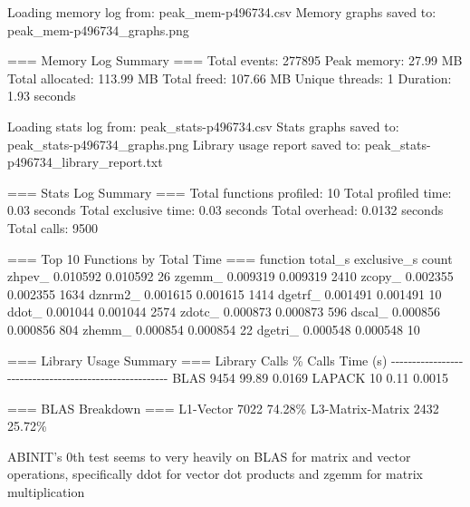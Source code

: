 \documentclass[
]{article}
\newenvironment{Shaded}{}{}
\newcommand{\NormalTok}[1]{#1}
\begin{document}
\begin{Shaded}
\begin{Highlighting}[]
\NormalTok{Loading memory log from: peak\_mem{-}p496734.csv}
\NormalTok{Memory graphs saved to: peak\_mem{-}p496734\_graphs.png}

\NormalTok{=== Memory Log Summary ===}
\NormalTok{Total events: 277895}
\NormalTok{Peak memory: 27.99 MB}
\NormalTok{Total allocated: 113.99 MB}
\NormalTok{Total freed: 107.66 MB}
\NormalTok{Unique threads: 1}
\NormalTok{Duration: 1.93 seconds}

\NormalTok{Loading stats log from: peak\_stats{-}p496734.csv}
\NormalTok{Stats graphs saved to: peak\_stats{-}p496734\_graphs.png}
\NormalTok{Library usage report saved to: peak\_stats{-}p496734\_library\_report.txt}

\NormalTok{=== Stats Log Summary ===}
\NormalTok{Total functions profiled: 10}
\NormalTok{Total profiled time: 0.03 seconds}
\NormalTok{Total exclusive time: 0.03 seconds}
\NormalTok{Total overhead: 0.0132 seconds}
\NormalTok{Total calls: 9500}

\NormalTok{=== Top 10 Functions by Total Time ===}
\NormalTok{function  total\_s  exclusive\_s  count}
\NormalTok{  zhpev\_ 0.010592     0.010592     26}
\NormalTok{  zgemm\_ 0.009319     0.009319   2410}
\NormalTok{  zcopy\_ 0.002355     0.002355   1634}
\NormalTok{ dznrm2\_ 0.001615     0.001615   1414}
\NormalTok{ dgetrf\_ 0.001491     0.001491     10}
\NormalTok{   ddot\_ 0.001044     0.001044   2574}
\NormalTok{  zdotc\_ 0.000873     0.000873    596}
\NormalTok{  dscal\_ 0.000856     0.000856    804}
\NormalTok{  zhemm\_ 0.000854     0.000854     22}
\NormalTok{ dgetri\_ 0.000548     0.000548     10}

\NormalTok{=== Library Usage Summary ===}
\NormalTok{Library         Calls        \% Calls    Time (s)}
\NormalTok{{-}{-}{-}{-}{-}{-}{-}{-}{-}{-}{-}{-}{-}{-}{-}{-}{-}{-}{-}{-}{-}{-}{-}{-}{-}{-}{-}{-}{-}{-}{-}{-}{-}{-}{-}{-}{-}{-}{-}{-}{-}{-}{-}{-}{-}{-}{-}{-}{-}{-}{-}{-}{-}{-}{-}}
\NormalTok{BLAS            9454         99.89      0.0169}
\NormalTok{LAPACK          10           0.11       0.0015}

\NormalTok{=== BLAS Breakdown ===}
\NormalTok{  L1{-}Vector            7022         74.28\%}
\NormalTok{  L3{-}Matrix{-}Matrix     2432         25.72\%}
\end{Highlighting}
\end{Shaded}

ABINIT's 0th test seems to very heavily on BLAS for matrix and vector
operations, specifically ddot for vector dot products and zgemm for
matrix multiplication
\end{document}

